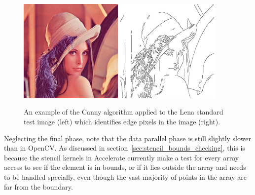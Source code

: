 \begin{figure}
    \begin{center}
        \includegraphics[width=0.45\textwidth]{images/sec-6/canny/lena}
        \includegraphics[width=0.45\textwidth]{images/sec-6/canny/lena-edges}
    \end{center}
    \caption[Example of the Canny edge detection algorithm]{An example of the
        Canny algorithm applied to the Lena standard test image (left) which
        identifies edge pixels in the image (right).}
    \label{fig:lena}
\end{figure}

Neglecting the final phase, note that the data parallel phase is still slightly
slower than in OpenCV. As discussed in
section~\ref{sec:stencil_bounds_checking}, this is because the stencil kernels
in Accelerate currently make a test for every array access to see if the element
is in bounds, or if it lies outside the array and needs to be handled specially,
even though the vast majority of points in the array are far from the boundary.

